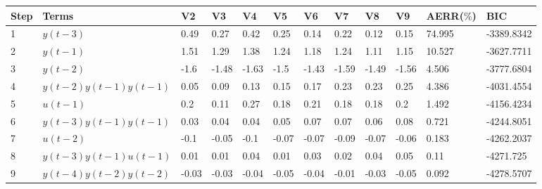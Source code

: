 \begin{tabular}{llllllllllll}
Step & Terms & V2 & V3 & V4 & V5 & V6 & V7 & V8 & V9 & AERR($\%$) & BIC \\ 
\hline 
1 & $y(t-3)$ & 0.49 & 0.27 & 0.42 & 0.25 & 0.14 & 0.22 & 0.12 & 0.15 & 74.995 & -3389.8342 \\ 
2 & $y(t-1)$ & 1.51 & 1.29 & 1.38 & 1.24 & 1.18 & 1.24 & 1.11 & 1.15 & 10.527 & -3627.7711 \\ 
3 & $y(t-2)$ & -1.6 & -1.48 & -1.63 & -1.5 & -1.43 & -1.59 & -1.49 & -1.56 & 4.506 & -3777.6804 \\ 
4 & $y(t-2)y(t-1)y(t-1)$ & 0.05 & 0.09 & 0.13 & 0.15 & 0.17 & 0.23 & 0.23 & 0.25 & 4.386 & -4031.4554 \\ 
5 & $u(t-1)$ & 0.2 & 0.11 & 0.27 & 0.18 & 0.21 & 0.18 & 0.18 & 0.2 & 1.492 & -4156.4234 \\ 
6 & $y(t-3)y(t-1)y(t-1)$ & 0.03 & 0.04 & 0.04 & 0.05 & 0.07 & 0.07 & 0.06 & 0.08 & 0.721 & -4244.8051 \\ 
7 & $u(t-2)$ & -0.1 & -0.05 & -0.1 & -0.07 & -0.07 & -0.09 & -0.07 & -0.06 & 0.183 & -4262.2037 \\ 
8 & $y(t-3)y(t-1)u(t-1)$ & 0.01 & 0.01 & 0.04 & 0.01 & 0.03 & 0.02 & 0.04 & 0.05 & 0.11 & -4271.725 \\ 
9 & $y(t-4)y(t-2)y(t-2)$ & -0.03 & -0.03 & -0.04 & -0.05 & -0.04 & -0.01 & -0.03 & -0.05 & 0.092 & -4278.5707 \\ 
\hline 
\end{tabular}